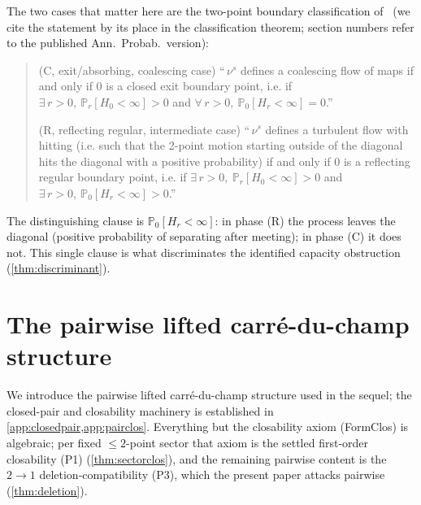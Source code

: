 \documentclass[reqno,final,11pt]{amsart}
\theoremstyle{plain}
\theoremstyle{definition}
\theoremstyle{remark}
\newcommand{\Prob}{\mathbb P}
\begin{document}
\noindent The two cases that matter here are the two-point boundary
classification of~\citep[Theorem~1.1 and~\S9]{LJR-FCN} (we cite the statement by
its place in the classification theorem; section numbers refer to the published
Ann.\ Probab.\ version):
\begin{quote}
\textnormal{(C, exit/absorbing, coalescing case)} ``\,$\nu^{s}$ defines a
coalescing flow of maps if and only if $0$ is a closed exit boundary point,
i.e. if $\exists\, r>0,\ \Prob_r[H_0<\infty]>0$ and $\forall\, r>0,\
\Prob_0[H_r<\infty]=0$.''

\textnormal{(R, reflecting regular, intermediate case)} ``\,$\nu^{s}$
defines a turbulent flow with hitting (i.e. such that the 2-point motion
starting outside of the diagonal hits the diagonal with a positive
probability) if and only if $0$ is a reflecting regular boundary point, i.e. if
$\exists\, r>0,\ \Prob_r[H_0<\infty]>0$ and $\exists\, r>0,\
\Prob_0[H_r<\infty]>0$.''
\end{quote}
The distinguishing clause is $\Prob_0[H_r<\infty]$: in phase (R) the process
leaves the diagonal (positive probability of separating after
meeting); in phase (C) it does not. This single clause is what discriminates the
identified capacity obstruction (\cref{thm:discriminant}).

\section{The pairwise lifted carr\'e-du-champ structure}\label{sec:recap}

We introduce the pairwise lifted carr\'e-du-champ structure used in the sequel;
the closed-pair and closability machinery is established in
\cref{app:closedpair,app:pairclos}. Everything but the closability axiom
(FormClos) is algebraic; per fixed $\le2$-point sector that axiom is the settled
first-order closability (P1) (\cref{thm:sectorclos}), and the remaining pairwise
content is the $2\to1$ deletion-compatibility (P3), which the present paper
attacks pairwise (\cref{thm:deletion}).
\end{document}
